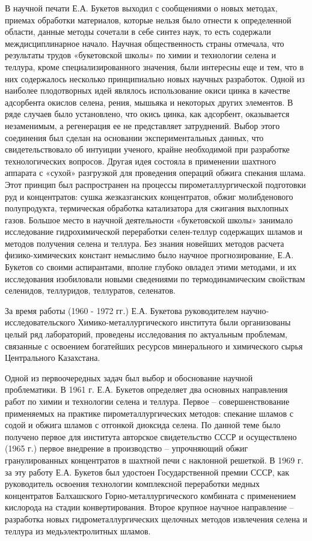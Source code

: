 \begin{multicols}{2}
В научной печати Е.А. Букетов выходил с сообщениями о новых методах,
приемах обработки материалов, которые нельзя было отнести к определенной
области, данные методы сочетали в себе синтез наук, то есть содержали
междисциплинарное начало. Научная общественность страны отмечала, что
результаты трудов «букетовской школы» по химии и технологии селена и
теллура, кроме специализированного значения, были интересны еще и тем,
что в них содержалось несколько принципиально новых научных разработок.
Одной из наиболее плодотворных идей являлось использование окиси цинка в
качестве адсорбента окислов селена, рения, мышьяка и некоторых других
элементов. В ряде случаев было установлено, что окись цинка, как
адсорбент, оказывается незаменимым, а регенерация ее не представляет
затруднений. Выбор этого соединения был сделан на основании
экспериментальных данных, что свидетельствовало об интуиции ученого,
крайне необходимой при разработке технологических вопросов. Другая идея
состояла в применении шахтного аппарата с «сухой» разгрузкой для
проведения операций обжига спекания шлама. Этот принцип был
распространен на процессы пирометаллургической подготовки руд и
концентратов: сушка жезказганских концентратов, обжиг молибденового
полупродукта, термическая обработка катализатора для сжигания выхлопных
газов. Большое место в научной деятельности «букетовской школы» занимало
исследование гидрохимической переработки селен-теллур содержащих шламов
и методов получения селена и теллура. Без знания новейших методов
расчета физико-химических констант немыслимо было научное
прогнозирование, Е.А. Букетов со своими аспирантами, вполне глубоко
овладел этими методами, и их исследования изобиловали новыми сведениями
по термодинамическим свойствам селенидов, теллуридов, теллуратов,
селенатов.

За время работы (1960 - 1972 гг.) Е.А. Букетова руководителем
научно-исследовательского Химико-металлургического института были
организованы целый ряд лабораторий, проведены исследования по актуальным
проблемам, связанные с освоением богатейших ресурсов минерального и
химического сырья Центрального Казахстана.

Одной из первоочередных задач был выбор и обоснование научной
проблематики. В 1961 г. Е.А. Букетов определяет два основных направления
работ по химии и технологии селена и теллура. Первое --
совершенствование применяемых на практике пирометаллургических методов:
спекание шламов с содой и обжига шламов с отгонкой диоксида селена. По
данной теме было получено первое для института авторское свидетельство
СССР и осуществлено (1965 г.) первое внедрение в производство --
упрочняющий обжиг гранулированных концентратов в шахтной печи с
наклонной решеткой. В 1969 г. за эту работу Е.А. Букетов был удостоен
Государственной премии СССР, как руководитель освоения технологии
комплексной переработки медных концентратов Балхашского
Горно-металлургического комбината с применением кислорода на стадии
конвертирования. Второе крупное научное направление -- разработка новых
гидрометаллургических щелочных методов извлечения селена и теллура из
медьэлектролитных шламов.


\end{multicols}
